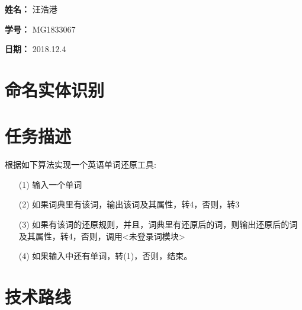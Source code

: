 \documentclass[UTF8]{article}
\begin{document}
    
{\flushleft \bf \Large 姓名：} 汪浩港

{\flushleft \bf \Large 学号：} MG1833067

{\flushleft \bf \Large 日期：} 2018.12.4

\section*{命名实体识别}
    
    
\section{任务描述}

根据如下算法实现一个英语单词还原工具:

\begin{itemize}
    \item[(1)] 输入一个单词
    
    \item[(2)]  如果词典里有该词，输出该词及其属性，转4，否则，转3
    
    \item[(3)]  如果有该词的还原规则，并且，词典里有还原后的词，则输出还原后的词及其属性，转4，否则，调用<未登录词模块>
    
    \item[(4)]  如果输入中还有单词，转(1)，否则，结束。

         
\end{itemize}


\section{技术路线}
\end{document}
